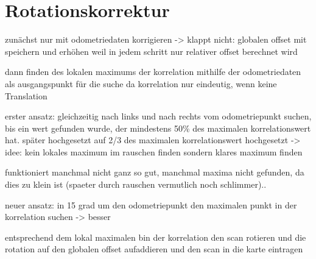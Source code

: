 \section{Rotationskorrektur}

zunächst nur mit odometriedaten korrigieren -> klappt nicht: globalen offset mit speichern und erhöhen weil in jedem schritt nur relativer offset berechnet wird

dann finden des lokalen maximums der korrelation mithilfe der odometriedaten als ausgangspunkt für die suche da korrelation nur eindeutig, wenn keine Translation

erster ansatz: gleichzeitig nach links und nach rechts vom odometriepunkt suchen, bis ein wert gefunden wurde, der mindestens 50\% des maximalen korrelationswert hat. später hochgesetzt auf 2/3 des maximalen korrelationswert hochgesetzt -> idee: kein lokales maximum im rauschen finden sondern klares maximum finden

funktioniert manchmal nicht ganz so gut, manchmal maxima nicht gefunden, da dies zu klein ist (spaeter durch rauschen vermutlich noch schlimmer)..

neuer ansatz: in 15 grad um den odometriepunkt den maximalen punkt in der korrelation suchen -> besser

entsprechend dem lokal maximalen bin der korrelation den scan rotieren und die rotation auf den globalen offset aufaddieren und den scan in die karte eintragen